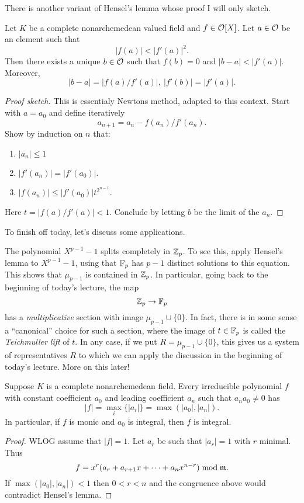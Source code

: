 There is another variant of Hensel's lemma whose proof I will only sketch.
\begin{theorem}
  Let $K$ be a complete nonarchemedean valued field and $f \in \mathcal{O}[X]$.
  Let $a \in \mathcal{O}$ be an element such that
  \[ |f(a)| < |f'(a)|^{2}. \]
  Then there exists a unique $b \in \mathcal{O}$ such that $f(b) = 0$ and $|b-a| < |f'(a)|$.
  Moreover,
  \[ |b-a| = |f(a)/f'(a)|, \ |f'(b)| = |f'(a)|. \]
\end{theorem}
\begin{proof}[Proof sketch]
  This is essentialy Newtons method, adapted to this context.
  Start with $a = a_{0}$ and define iteratively
  \[ a_{n+1} = a_{n} - f(a_{n})/f'(a_{n}). \]
  Show by induction on $n$ that:
  \begin{enumerate}
    \item $|a_{n}| \leq 1$
    \item $|f'(a_{n})| = |f'(a_{0})|$.
    \item $|f(a_{n})| \leq |f'(a_{0})| t^{2^{n-1}}$.
  \end{enumerate}
  Here $t = |f(a)/f'(a)| < 1$.
  Conclude by letting $b$ be the limit of the $a_{n}$.
\end{proof}

To finish off today, let's discuss some applications.

\begin{example}
  The polynomial $X^{p-1}-1$ splits completely in $\mathbb{Z}_{p}$.
  To see this, apply Hensel's lemma to $X^{p-1}-1$, using that $\mathbb{F}_{p}$ has $p-1$ distinct solutions to this equation.
  This shows that $\mu_{p-1}$ is contained in $\mathbb{Z}_{p}$.
  In particular, going back to the beginning of today's lecture, the map
  \[ \mathbb{Z}_{p} \to \mathbb{F}_{p} \]
  has a \emph{multiplicative} section with image $\mu_{p-1} \cup \{0\}$.
  In fact, there is in some sense a ``canonical'' choice for such a section, where the image of $t \in \mathbb{F}_{p}$ is called the \emph{Teichmuller lift} of $t$.
  In any case, if we put $R = \mu_{p-1} \cup \{0\}$, this gives us a system of representatives $R$ to which we can apply the discussion in the beginning of today's lecture.
  More on this later!
\end{example}

\begin{corollary}
  Suppose $K$ is a complete nonarchemedean field.
  Every irreducible polynomial $f$ with constant coefficient $a_{0}$ and leading coefficient $a_{n}$ such that $a_{n} a_{0} \neq 0$ has
  \[ |f| = \max_{i}\{|a_{i}|\} = \max(|a_{0}|,|a_{n}|). \]
  In particular, if $f$ is monic and $a_{0}$ is integral, then $f$ is integral.
\end{corollary}
\begin{proof}
  WLOG assume that $|f| = 1$.
  Let $a_{r}$ be such that $|a_{r}| = 1$ with $r$ minimal.
  Thus
  \[ f = x^{r}(a_{r} + a_{r+1} x + \cdots + a_{n} x^{n-r}) \bmod \mathfrak{m}. \]
  If $\max(|a_{0}|,|a_{n}|) < 1$ then $0 < r < n$ and the congruence above would contradict Hensel's lemma.
\end{proof}

